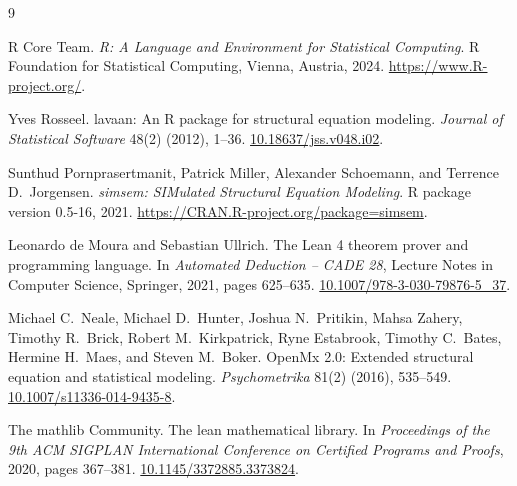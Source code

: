 \documentclass[11pt]{article}
\begin{document}
\begin{thebibliography}{9}

R Core Team.
\emph{R: A Language and Environment for Statistical Computing}.
R Foundation for Statistical Computing, Vienna, Austria, 2024.
\url{https://www.R-project.org/}.

Yves Rosseel.
lavaan: An R package for structural equation modeling.
\emph{Journal of Statistical Software} 48(2) (2012), 1--36.
\href{https://doi.org/10.18637/jss.v048.i02}{10.18637/jss.v048.i02}.

Sunthud Pornprasertmanit, Patrick Miller, Alexander Schoemann, and
Terrence D.\ Jorgensen.
\emph{simsem: SIMulated Structural Equation Modeling}.
R package version 0.5-16, 2021.
\url{https://CRAN.R-project.org/package=simsem}.

Leonardo de Moura and Sebastian Ullrich.
The Lean 4 theorem prover and programming language.
In \emph{Automated Deduction -- CADE 28}, Lecture Notes in Computer
Science, Springer, 2021, pages 625--635.
\href{https://doi.org/10.1007/978-3-030-79876-5_37}{10.1007/978-3-030-79876-5\_37}.

Michael C.~Neale, Michael D.~Hunter, Joshua N.~Pritikin, Mahsa Zahery,
Timothy R.~Brick, Robert M.~Kirkpatrick, Ryne Estabrook,
Timothy C.~Bates, Hermine H.~Maes, and Steven M.~Boker.
OpenMx 2.0: Extended structural equation and statistical modeling.
\emph{Psychometrika} 81(2) (2016), 535--549.
\href{https://doi.org/10.1007/s11336-014-9435-8}{10.1007/s11336-014-9435-8}.

The mathlib Community.
The lean mathematical library.
In \emph{Proceedings of the 9th ACM SIGPLAN International Conference
on Certified Programs and Proofs}, 2020, pages 367--381.
\href{https://doi.org/10.1145/3372885.3373824}{10.1145/3372885.3373824}.

\end{thebibliography}
\end{document}
